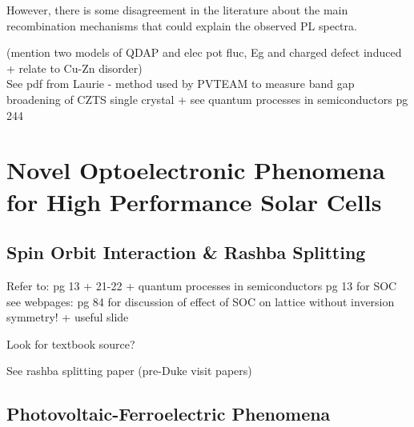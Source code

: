 However, there is some disagreement in the literature about the main recombination mechanisms that could explain the observed PL spectra.

(mention two models of QDAP and elec pot fluc, Eg and charged defect induced + relate to Cu-Zn disorder)\\


See pdf from Laurie - method used by PVTEAM to measure band gap broadening of CZTS single crystal + see quantum processes in semiconductors pg 244















\section{Novel Optoelectronic Phenomena for High Performance Solar Cells}


\subsection{Spin Orbit Interaction \& Rashba Splitting}\label{SOC_section}
Refer to: pg 13 + 21-22 \cite{Bechstedt} + quantum processes in semiconductors pg 13 for SOC\\

 see webpages: pg 84 for discussion of effect of SOC on lattice without inversion symmetry!  + useful slide

Look for textbook source?

See rashba splitting paper (pre-Duke visit papers)

\subsection{Photovoltaic-Ferroelectric Phenomena}\label{FE_PV_section}


